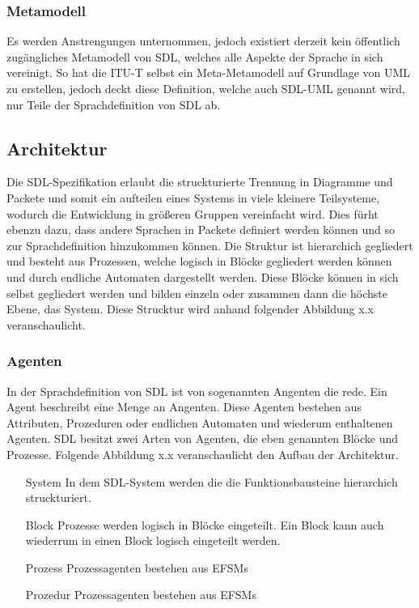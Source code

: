 \subsubsection{Metamodell}
\label{ssc:Metamodell}
Es werden Anstrengungen unternommen, jedoch existiert derzeit kein öffentlich zugängliches Metamodell von \ac{SDL}, welches alle 
Aspekte der Sprache in sich vereinigt. So hat die \ac{ITU-T} selbst ein Meta-Metamodell auf Grundlage von 
\ac{UML} zu erstellen, jedoch deckt diese Definition, welche auch SDL-UML genannt wird, nur Teile der Sprachdefinition von \ac{SDL} 
ab.

\subsection{Architektur}
\label{ssc:Architektur}
Die \ac{SDL}-Spezifikation erlaubt die struckturierte Trennung in Diagramme und Packete und somit ein aufteilen eines Systems in viele kleinere Teilsysteme, wodurch die Entwicklung in größeren Gruppen vereinfacht wird. Dies fürht ebenzu dazu, dass andere Sprachen in Packete definiert werden können und so zur Sprachdefinition hinzukommen können. Die Struktur ist hierarchich gegliedert und besteht aus Prozessen, welche logisch in Blöcke gegliedert werden können und durch endliche Automaten dargestellt werden. Diese Blöcke können in sich selbst gegliedert werden und bilden einzeln oder zusammen dann die höchste Ebene, das System. Diese Strucktur wird anhand folgender Abbildung x.x veranschaulicht.

\subsubsection{Agenten}
In der Sprachdefinition von \ac{SDL} ist von sogenannten Angenten die rede. Ein Agent beschreibt eine Menge an Angenten. Diese Agenten bestehen aus Attributen, Prozeduren oder endlichen Automaten und wiederum enthaltenen Agenten. \ac{SDL} besitzt zwei Arten von Agenten, die eben genannten Blöcke und Prozesse. Folgende Abbildung x.x veranschaulicht den Aufbau der Architektur.
\begin{itemize}
\item[System] In dem \ac{SDL}-System werden die die Funktionsbausteine hierarchich struckturiert. 
\item[Block] Prozesse werden logisch in Blöcke eingeteilt. Ein Block kann auch wiederrum in einen Block logisch eingeteilt werden.
\item[Prozess] Prozessagenten bestehen aus \ac{EFSM}s
\item[Prozedur] Prozessagenten bestehen aus \ac{EFSM}s
\end{itemize}

